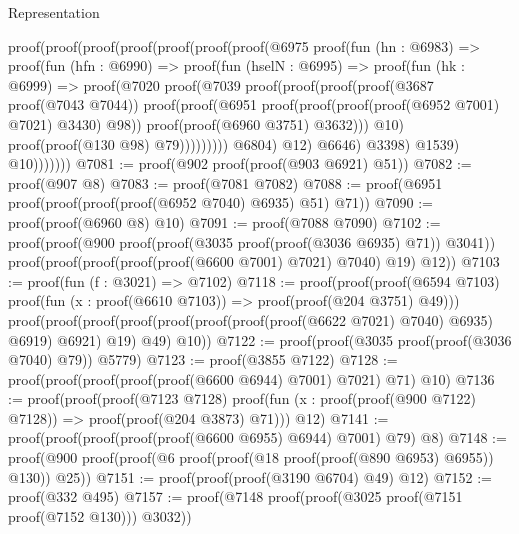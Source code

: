 \begin{lexlean}{Representation}
\begin{coremodule}
                proof(proof(proof(proof(proof(proof(proof(@6975
                                proof(fun (hn : @6983) =>
                                  proof(fun (hfn : @6990) =>
                                    proof(fun (hselN : @6995) =>
                                      proof(fun (hk : @6999) =>
                                        proof(@7020
                                            proof(@7039
                                                proof(proof(proof(proof(@3687 proof(@7043 @7044))
                                                        proof(proof(@6951
                                                              proof(proof(proof(proof(@6952 @7001)
                                                                      @7021)
                                                                    @3430)
                                                                  @98))
                                                            proof(proof(@6960 @3751) @3632)))
                                                      @10)
                                                    proof(proof(@130 @98) @79)))))))))
                              @6804)
                            @12)
                          @6646)
                        @3398)
                      @1539)
                    @10)))))))
@7081 := proof(@902 proof(proof(@903 @6921) @51))
@7082 := proof(@907 @8)
@7083 := proof(@7081 @7082)
@7088 := proof(@6951 proof(proof(proof(proof(@6952 @7040) @6935) @51) @71))
@7090 := proof(proof(@6960 @8) @10)
@7091 := proof(@7088 @7090)
@7102 := proof(proof(@900 proof(proof(@3035 proof(proof(@3036 @6935) @71)) @3041))
      proof(proof(proof(proof(proof(@6600 @7001) @7021) @7040) @19) @12))
@7103 := proof(fun (f : @3021) => @7102)
@7118 := proof(proof(proof(@6594 @7103)
        proof(fun (x : proof(@6610 @7103)) => proof(proof(@204 @3751) @49)))
      proof(proof(proof(proof(proof(proof(proof(proof(@6622 @7021) @7040) @6935) @6919) @6921) @19)
            @49)
          @10))
@7122 := proof(proof(@3035 proof(proof(@3036 @7040) @79)) @5779)
@7123 := proof(@3855 @7122)
@7128 := proof(proof(proof(proof(proof(@6600 @6944) @7001) @7021) @71) @10)
@7136 := proof(proof(proof(@7123 @7128)
        proof(fun (x : proof(proof(@900 @7122) @7128)) => proof(proof(@204 @3873) @71)))
      @12)
@7141 := proof(proof(proof(proof(proof(@6600 @6955) @6944) @7001) @79) @8)
@7148 := proof(@900 proof(proof(@6 proof(proof(@18 proof(proof(@890 @6953) @6955)) @130)) @25))
@7151 := proof(proof(proof(@3190 @6704) @49) @12)
@7152 := proof(@332 @495)
@7157 := proof(@7148 proof(proof(@3025 proof(@7151 proof(@7152 @130))) @3032))

\end{coremodule}
\end{lexlean}
